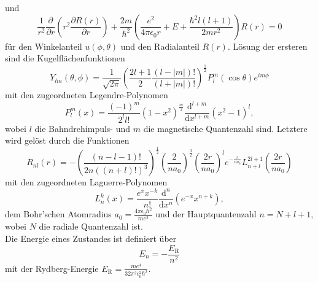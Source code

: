 und
\begin{equation}
  \frac{1}{r^2} \frac{\partial}{\partial r} \left( r^2 \frac{\partial R\left( r\right)}{\partial r} \right) + \frac{2m}{\hbar^2} \left( \frac{e^2}{4\pi \epsilon_0 r} + E + \frac{\hbar^2 l \left( l + 1 \right)}{2m r^2} \right) R\left( r \right) = 0
  \label{eq:radial_qm}
\end{equation}
für den Winkelanteil $u \left( \phi, \theta \right)$ und den Radialanteil $R\left( r\right)$.
Lösung der ersteren sind die Kugelflächenfunktionen
\begin{equation}
  Y_{lm} \left(\theta, \phi \right) = \frac{1}{\sqrt{2\pi}} \left( \frac{2l + 1}{2} \frac{\left(l - |m|\right)!}{\left(l + |m|\right)!} \right)^{\frac{1}{2}} P_l^{m} \left(\cos \theta \right) e^{im\phi}
  \label{eq:kugelflaechen}
\end{equation}
mit den zugeordneten Legendre-Polynomen
\begin{equation*}
  P_l^{m} (x) = \frac{(-1)^m}{2^l l!} \left( 1 - x^2 \right)^{\frac{m}{2}} \frac{\mathrm{d}^{l+m}}{\mathrm{d} x^{l+m}} \left(x^2 - 1 \right)^l,
\end{equation*}
wobei $l$ die Bahndrehimpuls- und $m$ die magnetische Quantenzahl sind. Letztere wird gelöst durch die Funktionen
\begin{equation*}
  R_{nl} (r) = - \left( \frac{\left( n - l - 1 \right)!}{2n\left(\left(n + l\right)!\right)^3} \right)^{\frac{1}{2}} \left( \frac{2}{na_0} \right)^{\frac{3}{2}} \left( \frac{2r}{na_0} \right)^{l} e^{-\frac{r}{n a_0}} L_{n+l}^{2l+1} \left( \frac{2r}{n a_0}\right)
\end{equation*}
mit den zugeordneten Laguerre-Polynomen
\begin{equation*}
  L_n^{k} (x) = \frac{e^x x^{-k}}{n!} \frac{\mathrm{d}^n}{\mathrm{d} x^n} \left( e^{-x} x^{n+k} \right),
\end{equation*}
dem Bohr'schen Atomradius $a_0 = \frac{4\pi \epsilon_0 \hbar^2}{m e^2}$ und der Hauptquantenzahl $n = N + l + 1$, wobei $N$ die radiale Quantenzahl ist.\\
Die Energie eines Zustandes ist definiert über
\begin{equation}
  E_n = - \frac{E_\mathrm{R}}{n^2}
  \label{eq:eigenenergie}
\end{equation}
mit der Rydberg-Energie $E_\mathrm{R} = \frac{m e^4}{32\pi^2 \epsilon_0^{2}\hbar^2}$.

